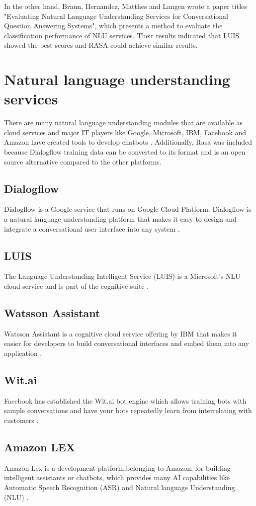\documentclass[conference]{IEEEtran}
\begin{document}
In the other hand, Braun, Hernandez, Matthes and Langen wrote a paper titles "Evaluating Natural Language Understanding Services for Conversational Question Answering Systems", which presents a method to evaluate the classification performance of NLU services. Their results indicated that LUIS showed the best scores and RASA could achieve similar results.

\section{Natural language understanding services} \label{sec:nluServices}
There are many natural language understanding modules that are available as cloud services and major IT players like Google, Microsoft, IBM, Facebook and Amazon have created tools to develop chatbots \cite{hall2017hands}. Additionally, Rasa was included because Dialogflow training data can be converted to its format and is an open source alternative compared to  the other platforms.
\subsection{Dialogflow}
Dialogflow is a Google service that runs on Google Cloud Platform. Dialogflow is a natural language understanding platform that makes it easy to design and integrate a conversational user interface into any system \cite{dialogflow2020}.
\subsection{LUIS}
The Language Understanding Intelligent Service (LUIS) is a Microsoft's NLU cloud service and is part of the cognitive suite \cite{pathak2018iot}.
\subsection{Watsson Assistant}
Watsson Assistant is a cognitive cloud service offering by IBM that makes it easier for developers to build conversational interfaces and embed them into any application \cite{sabharwal2019developing}.
\subsection{Wit.ai}
Facebook has established the Wit.ai bot engine which allows training bots with sample conversations and have your bots repeatedly learn from interrelating with customers \cite{seligman2018artificial}.
\subsection{Amazon LEX}
Amazon Lex is a development platform,belonging to Amazon, for building intelligent assistants or chatbots, which provides many AI capabilities like Automatic Speech Recognition (ASR) and Natural language Understanding (NLU) \cite{tripuraneni2019hands}.
\end{document}
